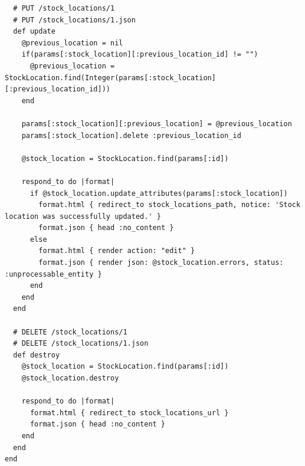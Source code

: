 \documentclass[a4paper]{article}
\begin{document}
\begin{verbatim}
  # PUT /stock_locations/1
  # PUT /stock_locations/1.json
  def update
    @previous_location = nil
    if(params[:stock_location][:previous_location_id] != "") 
      @previous_location = StockLocation.find(Integer(params[:stock_location][:previous_location_id]))
    end

    params[:stock_location][:previous_location] = @previous_location
    params[:stock_location].delete :previous_location_id

    @stock_location = StockLocation.find(params[:id])

    respond_to do |format|
      if @stock_location.update_attributes(params[:stock_location])
        format.html { redirect_to stock_locations_path, notice: 'Stock location was successfully updated.' }
        format.json { head :no_content }
      else
        format.html { render action: "edit" }
        format.json { render json: @stock_location.errors, status: :unprocessable_entity }
      end
    end
  end

  # DELETE /stock_locations/1
  # DELETE /stock_locations/1.json
  def destroy
    @stock_location = StockLocation.find(params[:id])
    @stock_location.destroy

    respond_to do |format|
      format.html { redirect_to stock_locations_url }
      format.json { head :no_content }
    end
  end
end

\end{verbatim}
\end{document}
